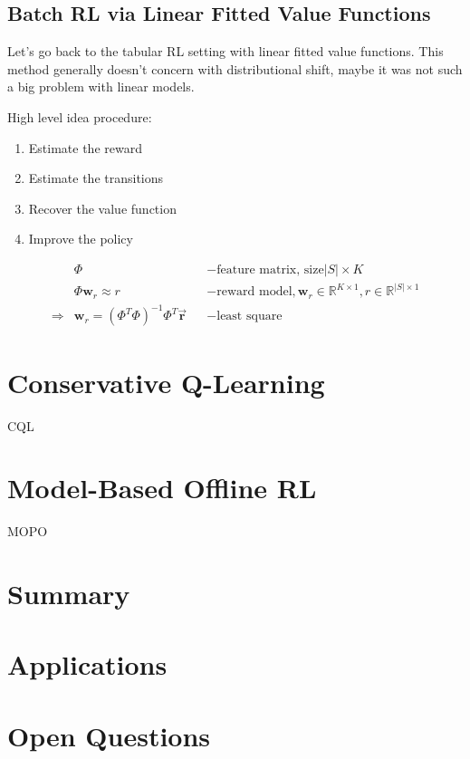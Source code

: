 
\subsection{Batch RL via Linear Fitted Value Functions}
Let's go back to the tabular \ac{RL} setting with linear fitted value functions. This method generally doesn't concern with distributional shift, maybe it was not such a big problem with linear models.

High level idea procedure:
\begin{enumerate}
	\item Estimate the reward
	\item Estimate the transitions
	\item Recover the value function
	\item Improve the policy
\end{enumerate}

\begin{align}
	&\Phi &&-\text{feature matrix, size} |S| \times K\\
	&\Phi \textbf{w}_r \approx r &&-\text{reward model}, \textbf{w}_r \in \mathbb{R}^{K\times 1}, r \in \mathbb{R}^{|S| \times 1}\\
	\Rightarrow & \textbf{w}_r = (\Phi^T \Phi)^{-1} \Phi^T \vec{\textbf{r}} &&-\text{least square}
\end{align}

\section{Conservative Q-Learning}
\ac{CQL}

\section{Model-Based Offline RL}
\ac{MOPO}

\section{Summary}
\section{Applications}
\section{Open Questions}

